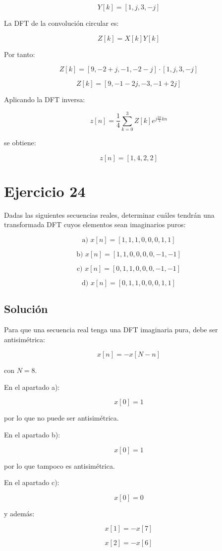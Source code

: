 \documentclass[fleqn]{article}
\begin{document}
	\[
	\boxed{
	Y[k]=[1,j,3,-j]
	}
	\]

	La DFT de la convolución circular es:

	\[
	Z[k]
	=
	X[k]Y[k]
	\]

	Por tanto:

	\[
	Z[k]
	=
	[9,-2+j,-1,-2-j]
	\cdot
	[1,j,3,-j]
	\]

	\[
	\boxed{
	Z[k]
	=
	[9,-1-2j,-3,-1+2j]
	}
	\]

	Aplicando la DFT inversa:

	\[
	z[n]
	=
	\frac{1}{4}
	\sum_{k=0}^{3}
	Z[k]e^{j\frac{2\pi}{4}kn}
	\]

	se obtiene:

	\[
	\boxed{
	z[n]=[1,4,2,2]
	}
	\]

\section{Ejercicio 24}
	Dadas las siguientes secuencias reales, determinar cuáles tendrán una transformada DFT cuyos elementos sean imaginarios puros:

	\[
	\text{a) }x[n]=[1,1,1,0,0,0,1,1]
	\]

	\[
	\text{b) }x[n]=[1,1,0,0,0,0,-1,-1]
	\]

	\[
	\text{c) }x[n]=[0,1,1,0,0,0,-1,-1]
	\]

	\[
	\text{d) }x[n]=[0,1,1,0,0,0,1,1]
	\]

	\subsection{Solución}

	Para que una secuencia real tenga una DFT imaginaria pura, debe ser antisimétrica:

	\[
	x[n]
	=
	-x[N-n]
	\]

	con $N=8$.

	En el apartado a):

	\[
	x[0]=1
	\]

	por lo que no puede ser antisimétrica.

	En el apartado b):

	\[
	x[0]=1
	\]

	por lo que tampoco es antisimétrica.

	En el apartado c):

	\[
	x[0]=0
	\]

	y además:

	\[
	x[1]=-x[7]
	\]

	\[
	x[2]=-x[6]
	\]
\end{document}

